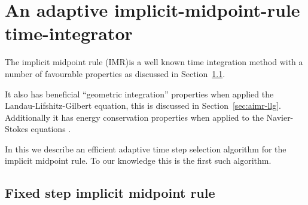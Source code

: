 

\chapter{An adaptive implicit-midpoint-rule time-integrator}
\label{sec:adaptive-imr}


The implicit midpoint rule (IMR)is a well known time integration method\cite[pg. 204]{HairerNorsettWanner} with a number of favourable properties as discussed in Section~\ref{sec:fixed-step-implicit}.






It also has beneficial ``geometric integration'' properties when applied the Landau-Lifshitz-Gilbert equation, this is discussed in Section~\ref{sec:aimr-llg}. 
Additionally it has energy conservation properties when applied to the Navier-Stokes equations \cite{Sanderse2013}.


In this \secpaper{} we describe an efficient adaptive time step selection algorithm for the implicit midpoint rule. To our knowledge this is the first such algorithm.

\section{Fixed step implicit midpoint rule}
\label{sec:fixed-step-implicit}

